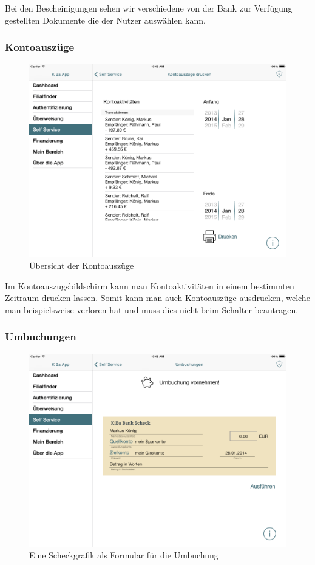 Bei den Bescheinigungen sehen wir verschiedene von der Bank zur Verfügung gestellten Dokumente die der Nutzer auswählen kann.

\subsubsection{Kontoauszüge}
\begin{figure}[h]
	\centering
  \includegraphics[scale=0.4]{Pictures/kontoauszuege}
	\caption{Übersicht der Kontoauszüge}
	\label{fig7}
\end{figure}

	Im Kontoauszugsbildschirm kann man Kontoaktivitäten in einem bestimmten Zeitraum drucken lassen. Somit kann man auch Kontoauszüge ausdrucken, welche man beispielsweise verloren hat und muss dies nicht beim Schalter beantragen.

\subsubsection{Umbuchungen}
\begin{figure}[h]
	\centering
  \includegraphics[scale=0.4]{Pictures/umbuchung}
	\caption{Eine Scheckgrafik als Formular für die Umbuchung}
	\label{fig8}
\end{figure}

